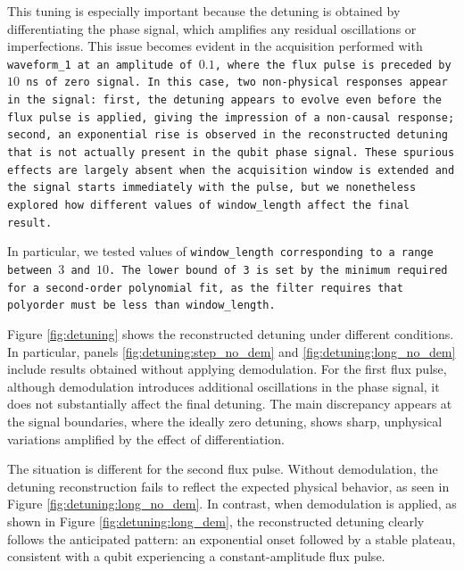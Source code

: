 This tuning is especially important because the detuning is obtained by differentiating the phase signal, which amplifies any residual oscillations or imperfections. 
This issue becomes evident in the acquisition performed with \tt{waveform\_1} at an amplitude of $0.1$, where the flux pulse is preceded by $10$ ns of zero signal. 
In this case, two non-physical responses appear in the signal: first, the detuning appears to evolve even before the flux pulse is applied, giving the impression of a non-causal response; second, an exponential rise is observed in the reconstructed detuning that is not actually present in the qubit phase signal. 
These spurious effects are largely absent when the acquisition window is extended and the signal starts immediately with the pulse, but we nonetheless explored how different values of \tt{window\_length} affect the final result.

In particular, we tested values of \tt{window\_length} corresponding to a range between $3$ and $10$. 
The lower bound of 3 is set by the minimum required for a second-order polynomial fit, as the filter requires that \tt{polyorder} must be less than \tt{window\_length}.

Figure \ref{fig:detuning} shows the reconstructed detuning under different conditions. 
In particular, panels \ref{fig:detuning:step_no_dem} and \ref{fig:detuning:long_no_dem} include results obtained without applying demodulation. 
For the first flux pulse, although demodulation introduces additional oscillations in the phase signal, it does not substantially affect the final detuning.
The main discrepancy appears at the signal boundaries, where the ideally zero detuning, shows sharp, unphysical variations amplified by the effect of differentiation.

The situation is different for the second flux pulse. 
Without demodulation, the detuning reconstruction fails to reflect the expected physical behavior, as seen in Figure \ref{fig:detuning:long_no_dem}. 
In contrast, when demodulation is applied, as shown in Figure \ref{fig:detuning:long_dem}, the reconstructed detuning clearly follows the anticipated pattern: an exponential onset followed by a stable plateau, consistent with a qubit experiencing a constant-amplitude flux pulse.


